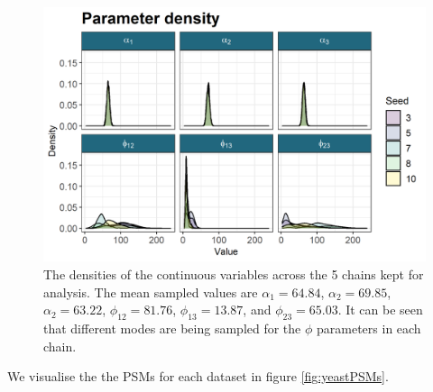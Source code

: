\documentclass[]{article}
\begin{document}
\begin{figure}
	\centering
	\includegraphics[scale=1]{./Images/Yeast/densityPlotReduced.png}
	\caption{The densities of the continuous variables across the 5 chains kept for analysis. The mean sampled values are $\alpha_1= 64.84$, $\alpha_2 = 69.85$, $\alpha_2 = 63.22$, $\phi_{12} = 81.76$, $\phi_{13} = 13.87$, and $\phi_{23} = 65.03$. It can be seen that different modes are being sampled for the $\phi$ parameters in each chain.
	}
	\label{fig:bayesDensities}
\end{figure}

We visualise the the PSMs for each dataset in figure \ref{fig:yeastPSMs}. 
\end{document}
